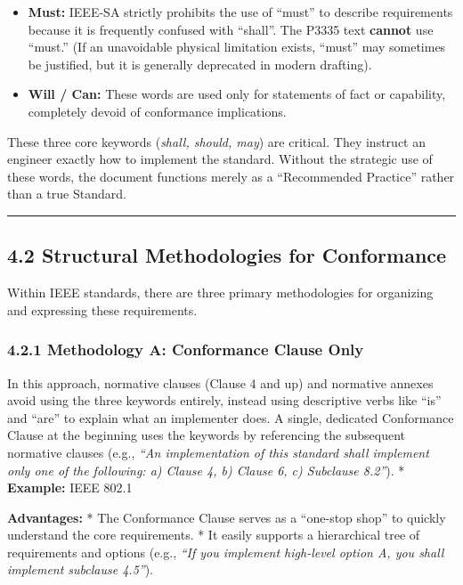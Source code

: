 \begin{itemize}
\tightlist
\item
  \textbf{Must:} IEEE-SA strictly prohibits the use of ``must'' to
  describe requirements because it is frequently confused with
  ``shall''. The P3335 text \textbf{cannot} use ``must.'' (If an
  unavoidable physical limitation exists, ``must'' may sometimes be
  justified, but it is generally deprecated in modern drafting).
\item
  \textbf{Will / Can:} These words are used only for statements of fact
  or capability, completely devoid of conformance implications.
\end{itemize}

These three core keywords (\emph{shall, should, may}) are critical. They
instruct an engineer exactly how to implement the standard. Without the
strategic use of these words, the document functions merely as a
``Recommended Practice'' rather than a true Standard.

\begin{center}\rule{0.5\linewidth}{0.5pt}\end{center}

\subsection{4.2 Structural Methodologies for
Conformance}\label{structural-methodologies-for-conformance}

Within IEEE standards, there are three primary methodologies for
organizing and expressing these requirements.

\subsubsection{4.2.1 Methodology A: Conformance Clause
Only}\label{methodology-a-conformance-clause-only}

In this approach, normative clauses (Clause 4 and up) and normative
annexes avoid using the three keywords entirely, instead using
descriptive verbs like ``is'' and ``are'' to explain what an implementer
does. A single, dedicated Conformance Clause at the beginning uses the
keywords by referencing the subsequent normative clauses (e.g.,
\emph{``An implementation of this standard shall implement only one of
the following: a) Clause 4, b) Clause 6, c) Subclause 8.2''}). *
\textbf{Example:} IEEE 802.1

\textbf{Advantages:} * The Conformance Clause serves as a ``one-stop
shop'' to quickly understand the core requirements. * It easily supports
a hierarchical tree of requirements and options (e.g., \emph{``If you
implement high-level option A, you shall implement subclause 4.5''}).

